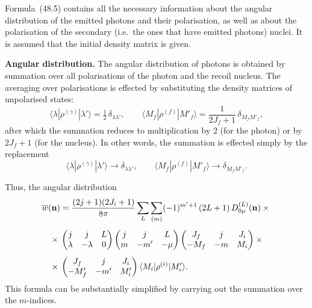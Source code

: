 Formula~(48.5) contains all the necessary information about the angular distribution of the emitted photons and their polarisation, as well as about the polarisation of the secondary (i.e.\ the ones that have emitted photons) nuclei. It is assumed that the initial density matrix is given.

\textbf{Angular distribution.} The angular distribution of photons is obtained by summation over all polarisations of the photon and the recoil nucleus. The averaging over polarisations is effected by substituting the density matrices of unpolarised states:
\begin{equation}
\langle\lambda|\rho^{(\gamma)}|\lambda'\rangle = \tfrac{1}{2}\,\delta_{\lambda\lambda'},\qquad \langle M_f|\rho^{(f)}|M'_f\rangle = \frac{1}{2J_f + 1}\,\delta_{M_f M'_f},
\tag{48.6}
\end{equation}
after which the summation reduces to multiplication by 2 (for the photon) or by $2J_f + 1$ (for the nucleus). In other words, the summation is effected simply by the replacement
\begin{equation}
\langle\lambda|\rho^{(\gamma)}|\lambda'\rangle \to \delta_{\lambda\lambda'},\qquad \langle M_f|\rho^{(f)}|M'_f\rangle \to \delta_{M_f M'_f}.
\tag{48.7}
\end{equation}

Thus, the angular distribution
\begin{align}
\overline{w}(\mathbf{n}) &= \frac{(2j+1)(2J_i+1)}{8\pi}\sum_L\sum_{(m)}(-1)^{m'+1}\,(2L+1)\,D^{(L)}_{0\mu}(\mathbf{n})\times{}\notag\\[4pt]
{}\times{}&\begin{pmatrix} j & j & L \\ \lambda & -\lambda & 0\end{pmatrix}\begin{pmatrix} j & j & L \\ m & -m' & -\mu\end{pmatrix}\begin{pmatrix} J_f & j & J_i \\ -M_f & -m & M_i\end{pmatrix}\times{}\notag\\[4pt]
{}\times{}&\begin{pmatrix} J_f & j & J_i \\ -M'_f & -m' & M'_i\end{pmatrix}\langle M_i|\rho^{(i)}|M'_i\rangle.
\end{align}
This formula can be substantially simplified by carrying out the summation over the $m$-indices.

